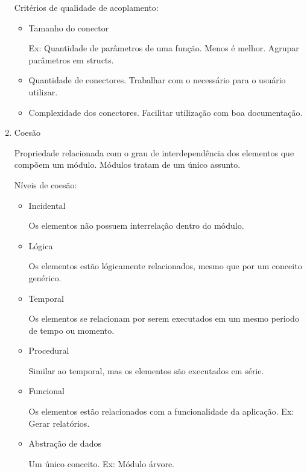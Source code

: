 \documentclass[
	12pt, %
]{fphw}
\begin{document}
\begin{doublespace}
\begin{enumerate}
        Critérios de qualidade de acoplamento:

        \begin{itemize}

            \item Tamanho do conector
            
            Ex: Quantidade de parâmetros de uma função. Menos é melhor. Agrupar parâmetros em structs.

            \item Quantidade de conectores. Trabalhar com o necessário para o usuário utilizar.
            \item Complexidade dos conectores. Facilitar utilização com boa documentação.
            
        \end{itemize}

        \item Coesão
        
        Propriedade relacionada com o grau de interdependência dos elementos que compõem um módulo. Módulos tratam de um único assunto.

        Níveis de coesão:

        \begin{itemize}
            
            \item Incidental
            
            Os elementos não possuem interrelação dentro do módulo.

            \item Lógica
            
            Os elementos estão lógicamente relacionados, mesmo que por um conceito genérico.

            \item Temporal
            
            Os elementos se relacionam por serem executados em um mesmo periodo de tempo ou momento.

            \item Procedural
            
            Similar ao temporal, mas os elementos são executados em série.

            \item Funcional
            
            Os elementos estão relacionados com a funcionalidade da aplicação. Ex: Gerar relatórios.

            \item Abstração de dados
            
            Um único conceito. Ex: Módulo árvore.
            
        \end{itemize}

    \end{enumerate}

\end{doublespace}
\end{document}
